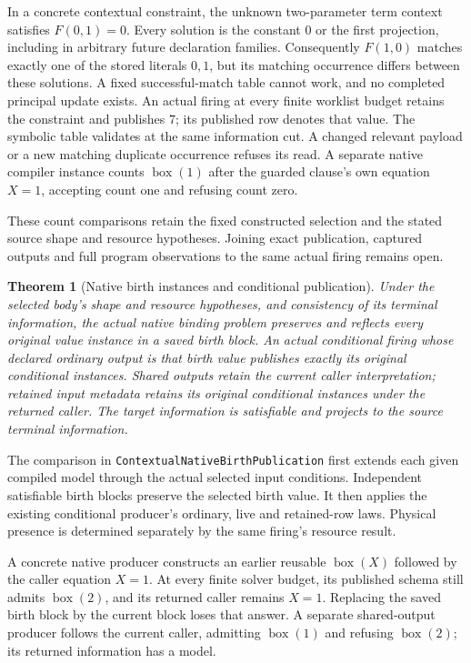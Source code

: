 \documentclass[11pt]{article}
\newtheorem{theorem}{Theorem}
\newcommand{\code}[1]{\texttt{\small #1}}
\begin{document}
In a concrete contextual constraint, the unknown two-parameter term
context satisfies $F(0,1)=0$. Every solution is the constant $0$ or the
first projection, including in arbitrary future declaration families.
Consequently $F(1,0)$ matches exactly one of the stored literals $0,1$,
but its matching occurrence differs between these solutions. A fixed
successful-match table cannot work, and no completed principal update
exists. An actual firing at every finite worklist budget retains the
constraint and publishes $7$; its published row denotes that value.
The symbolic table validates at the same information cut. A changed
relevant payload or a new matching duplicate occurrence refuses its read.
A separate native compiler instance counts
$\operatorname{box}(1)$ after the guarded clause's own equation $X=1$,
accepting count one and refusing count zero.

These count comparisons retain the fixed constructed selection and the
stated source shape and resource hypotheses. Joining exact publication,
captured outputs and full program observations to the same actual firing
remains open.

\begin{theorem}[Native birth instances and conditional publication]
Under the selected body's shape and resource hypotheses, and consistency
of its terminal information, the actual native binding problem preserves
and reflects every original value instance in a saved birth block.
An actual conditional firing whose declared ordinary output is that
birth value publishes exactly its original conditional instances.
Shared outputs retain the current caller interpretation; retained input
metadata retains its original conditional instances under the returned
caller. The target information is satisfiable and projects to the source
terminal information.
\end{theorem}
The comparison in \code{ContextualNativeBirthPublication} first extends
each given compiled model through the actual selected input conditions.
Independent satisfiable birth blocks preserve the selected birth value.
It then applies the existing conditional producer's ordinary, live and
retained-row laws. Physical presence is determined separately by the
same firing's resource result.

A concrete native producer constructs an earlier reusable
$\operatorname{box}(X)$ followed by the caller equation $X=1$.
At every finite solver budget, its published schema still admits
$\operatorname{box}(2)$, and its returned caller remains $X=1$.
Replacing the saved birth block by the current block loses that answer.
A separate shared-output producer follows the current caller, admitting
$\operatorname{box}(1)$ and refusing $\operatorname{box}(2)$; its returned
information has a model.
\end{document}
